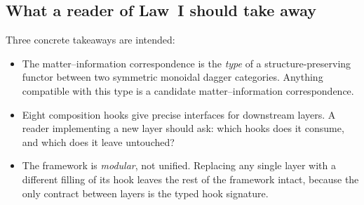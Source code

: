 \documentclass[12pt]{article}
\theoremstyle{definition}
\theoremstyle{remark}
\begin{document}
\subsection{What a reader of Law~I should take away}

Three concrete takeaways are intended:
\begin{itemize}
\item The matter--information correspondence is the \emph{type} of a structure-preserving functor between two symmetric monoidal dagger categories. Anything compatible with this type is a candidate matter--information correspondence.
\item Eight composition hooks give precise interfaces for downstream layers. A reader implementing a new layer should ask: which hooks does it consume, and which does it leave untouched?
\item The framework is \emph{modular}, not unified. Replacing any single layer with a different filling of its hook leaves the rest of the framework intact, because the only contract between layers is the typed hook signature.
\end{itemize}
\end{document}
